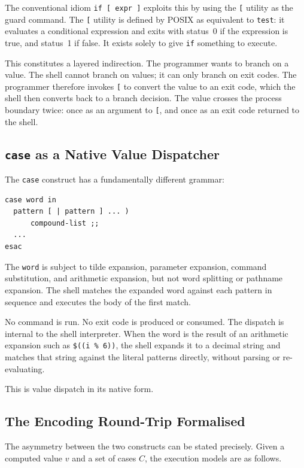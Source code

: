 \documentclass[11pt,a4paper]{article}
\begin{document}
The conventional idiom \texttt{if [ expr ]} exploits this by using
the \texttt{[} utility as the guard command.
The \texttt{[} utility is defined by POSIX as equivalent to
\texttt{test}: it evaluates a conditional expression and exits with
status~0 if the expression is true, and status~1 if false.
It exists solely to give \texttt{if} something to execute.

This constitutes a layered indirection.
The programmer wants to branch on a value.
The shell cannot branch on values; it can only branch on exit codes.
The programmer therefore invokes \texttt{[} to convert the value to
an exit code, which the shell then converts back to a branch decision.
The value crosses the process boundary twice: once as an argument to
\texttt{[}, and once as an exit code returned to the shell.

\subsection{\texttt{case} as a Native Value Dispatcher}

The \texttt{case} construct has a fundamentally different grammar:

\begin{lstlisting}[numbers=none,frame=none,aboveskip=2pt,belowskip=2pt]
case word in
  pattern [ | pattern ] ... )
      compound-list ;;
  ...
esac
\end{lstlisting}

The \texttt{word} is subject to tilde expansion, parameter expansion,
command substitution, and arithmetic expansion, but not word splitting
or pathname expansion.
The shell matches the expanded word against each pattern in sequence
and executes the body of the first match.

No command is run.
No exit code is produced or consumed.
The dispatch is internal to the shell interpreter.
When the word is the result of an arithmetic expansion such as
\texttt{\$((i \% 6))}, the shell expands it to a decimal string and
matches that string against the literal patterns directly, without
parsing or re-evaluating.

This is value dispatch in its native form.

\subsection{The Encoding Round-Trip Formalised}

The asymmetry between the two constructs can be stated precisely.
Given a computed value $v$ and a set of cases $C$, the execution
models are as follows.
\end{document}
